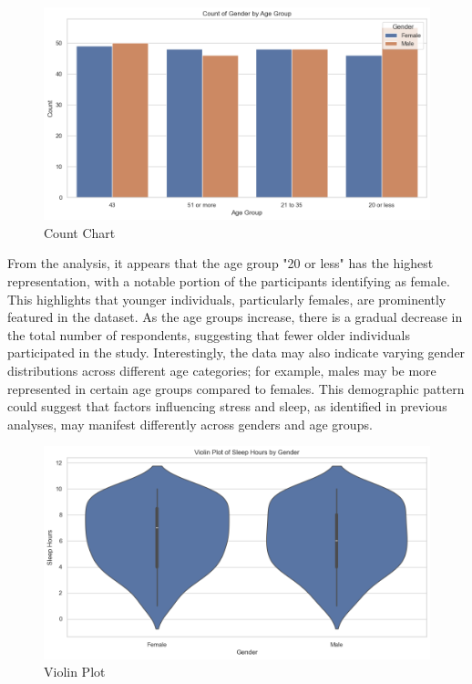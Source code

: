 \documentclass[runningheads]{llncs}
\begin{document}
\begin{enumerate}
\newpage
\begin{figure}
    \centering
    \includegraphics[width=1.0\linewidth]{eda7.png}
    \caption{Count Chart} 
    \label{fig:enter-label} 
\end{figure}

From the analysis, it appears that the age group "20 or less" has the highest representation, with a notable portion of the participants identifying as female. This highlights that younger individuals, particularly females, are prominently featured in the dataset. As the age groups increase, there is a gradual decrease in the total number of respondents, suggesting that fewer older individuals participated in the study. Interestingly, the data may also indicate varying gender distributions across different age categories; for example, males may be more represented in certain age groups compared to females. This demographic pattern could suggest that factors influencing stress and sleep, as identified in previous analyses, may manifest differently across genders and age groups.

\newpage
\begin{figure}
    \centering
    \includegraphics[width=1.0\linewidth]{eda8.png}
    \caption{Violin Plot} 
    \label{fig:enter-label}
\end{figure}


\end{enumerate}
\end{document}
